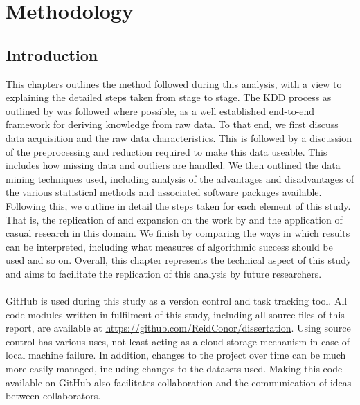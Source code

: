 %
%
%
%

\chapter{Methodology}\label{C.Methodology}
\section{Introduction}
{This chapters outlines the method followed during this analysis, with a view to explaining the detailed steps taken from stage to stage. The KDD process as outlined by \cite{fayyad1996kdd} was followed where possible, as a well established end-to-end framework for deriving knowledge from raw data. To that end, we first discuss data acquisition and the raw data characteristics. This is followed by a discussion of the preprocessing and reduction required to make this data useable. This includes how missing data and outliers are handled. We then outlined the data mining techniques used, including analysis of the advantages and disadvantages of the various statistical methods and associated software packages available. Following this, we outline in detail the steps taken for each element of this study. That is, the replication of and expansion on the work by \cite{moldovan2015learning} and the application of casual research in this domain. We finish by comparing the ways in which results can be interpreted, including what measures of algorithmic success should be used and so on. Overall, this chapter represents the technical aspect of this study and aims to facilitate the replication of this analysis by future researchers. \\\\
GitHub is used during this study as a version control and task tracking tool. All code modules written in fulfilment of this study, including all source files of this report, are available at \url {https://github.com/ReidConor/dissertation}. Using source control has various uses, not least acting as a cloud storage mechanism in case of local machine failure. In addition, changes to the project over time can be much more easily managed, including changes to the datasets used. Making this code available on GitHub also facilitates collaboration and the communication of ideas between collaborators.   }
